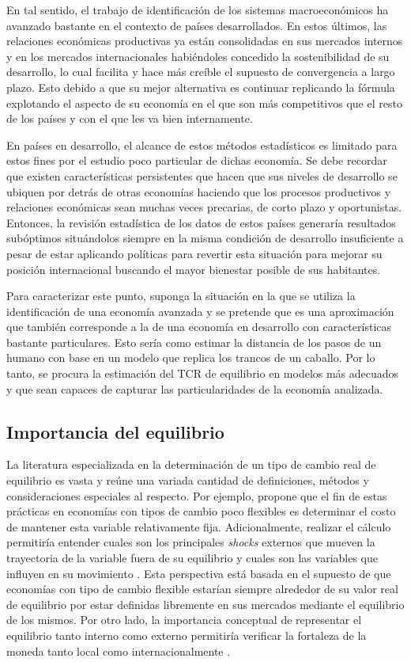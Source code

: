 \documentclass[12pt,letterpaper]{article}
\begin{document}
En tal sentido, el trabajo de identificación de los sistemas macroeconómicos ha avanzado bastante en el contexto de países desarrollados. En estos últimos, las relaciones económicas productivas ya están  consolidadas en sus mercados internos y en los mercados internacionales habiéndoles concedido la sostenibilidad de su desarrollo, lo cual facilita y hace más creíble el supuesto de convergencia a largo plazo. Esto debido a que su mejor alternativa es continuar replicando la fórmula explotando el aspecto de su economía en el que son más competitivos que el resto de los países y con el que les va bien internamente. 

En países en desarrollo, el alcance de estos métodos estadísticos es limitado para estos fines por el estudio poco particular de dichas economía. Se debe recordar que existen características persistentes que hacen que sus niveles de desarrollo se ubiquen por detrás de otras economías haciendo que los procesos productivos y relaciones económicas sean muchas veces precarias, de corto plazo y oportunistas. Entonces, la revisión estadística de los datos de estos países generaría resultados subóptimos situándolos siempre en la misma condición de desarrollo insuficiente a pesar de estar aplicando políticas para revertir esta situación para mejorar su posición internacional buscando el mayor bienestar posible de sus habitantes. 

Para caracterizar este punto, suponga la situación en la que se utiliza la identificación de una economía avanzada y se pretende que es una aproximación que también corresponde a la de una economía en desarrollo con características bastante particulares. Esto sería como estimar la distancia de los pasos de un humano con base en un modelo que replica los trancos de un caballo. Por lo tanto, se procura la estimación del TCR de equilibrio en modelos más adecuados y que sean capaces de capturar las particularidades de la economía analizada.


\subsection*{Importancia del equilibrio}
La literatura especializada en la determinación de un tipo de cambio real de equilibrio es vasta y reúne una variada cantidad de definiciones, métodos y consideraciones especiales al respecto. Por ejemplo, \cite{driver2005concepts} propone que el fin de estas prácticas en economías con tipos de cambio poco flexibles es determinar el costo de mantener esta variable relativamente fija. Adicionalmente, realizar el cálculo permitiría entender cuales son los principales \emph{shocks} externos que mueven la trayectoria de la variable fuera de su equilibrio y cuales son las variables que influyen en su movimiento \citep{macdonald2000concepts}. Esta perspectiva está basada en el supuesto de que economías con tipo de cambio flexible estarían siempre alrededor de su valor real de equilibrio por estar definidas libremente en sus mercados mediante el equilibrio de los mismos. Por otro lado, la importancia conceptual de representar el equilibrio tanto interno como externo permitiría verificar la fortaleza de la moneda tanto local como internacionalmente \citep{akrama2003real}.
\end{document}
